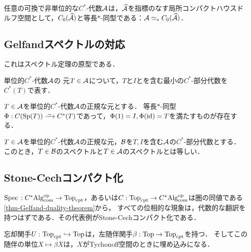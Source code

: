 \documentclass[uplatex,dvipdfmx]{jsreport}
\begin{document}
\begin{corollary}
    任意の可換で非単位的な$C^*$-代数$\mathcal{A}$は，$\widehat{\mathcal{A}}$を指標のなす局所コンパクトハウスドルフ空間として，$C_0(\widehat{\mathcal{A}})$と等長$*$-同型である：$\mathcal{A}\simeq_*C_0(\widehat{\mathcal{A}})$．
\end{corollary}

\subsection{Gelfandスペクトルの対応}

\begin{tcolorbox}[colframe=ForestGreen, colback=ForestGreen!10!white,breakable,colbacktitle=ForestGreen!40!white,coltitle=black,fonttitle=\bfseries\sffamily,
title=]
    これはスペクトル定理の原型である．
\end{tcolorbox}

\begin{notation}
    単位的$C^*$-代数$\mathcal{A}$の
    元$T\in\mathcal{A}$について，$T$と$I$とを含む最小の$C^*$-部分代数を$C^*(T)$で表す．
\end{notation}

\begin{proposition}\label{prop-seminal-spectral-theorem}
    $T\in\mathcal{A}$を単位的$C^*$-代数$\mathcal{A}$の正規な元とする．
    等長$*$-同型$\Phi:C(\Sp(T))\iso C^*(T)$であって，$\Phi(1)=I,\Phi(\mathrm{id})=T$を満たすものが存在する．
\end{proposition}

\begin{corollary}
    $T\in\mathcal{A}$を単位的$C^*$-代数$\mathcal{A}$の正規な元，$\mathcal{B}$を$T,I$を含む$\mathcal{A}$の$C^*$-部分代数とする．
    このとき，$T\in\mathcal{B}$のスペクトルと$T\in\mathcal{A}$のスペクトルとは等しい．
\end{corollary}

\subsection{Stone-Cechコンパクト化}

\begin{tcolorbox}[colframe=ForestGreen, colback=ForestGreen!10!white,breakable,colbacktitle=ForestGreen!40!white,coltitle=black,fonttitle=\bfseries\sffamily,
title=]
    $\mathrm{Spec}\,:C^*\mathrm{Alg}^{\mathrm{op}}_{\mathrm{com}}\to\mathrm{Top}_{\mathrm{cpt}}$，あるいは$C:\mathrm{Top}_{\mathrm{cpt}}\to C^*\mathrm{Alg}^{\mathrm{op}}_{\mathrm{com}}$は圏の同値である\ref{thm-Gelfand-duality-theorem}から，
    すべての位相的な現象は，代数的な翻訳を持つはずである．その代表例がStone-Cechコンパクト化である．

    忘却関手$U:\mathrm{Top}_{\mathrm{cpt}}\hookrightarrow\mathrm{Top}$は，左随伴関手$\beta:\mathrm{Top}\to\mathrm{Top}_{\mathrm{cpt}}$を持つ．
    そしてこの随伴の単位$X\mapsto\beta X$は，$X$がTychonoff空間のときに埋め込みになる．
\end{tcolorbox}
\end{document}
